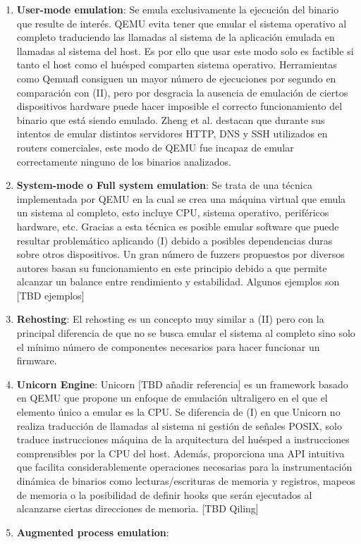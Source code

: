 \begin{enumerate}[I]
    \item \textbf{User-mode emulation}: Se emula exclusivamente la ejecución del binario que resulte de interés. QEMU evita tener que emular el sistema 
    operativo al completo traduciendo las llamadas al sistema de la aplicación emulada en llamadas al sistema del host. Es por ello que usar este modo 
    solo es factible si tanto el host como el huésped comparten sistema operativo. Herramientas como Qemuafl\cite{qemuafl} consiguen un mayor número de 
    ejecuciones por segundo en comparación con (II), pero por desgracia la ausencia de emulación de ciertos dispositivos hardware puede hacer imposible 
    el correcto funcionamiento del binario que está siendo emulado. Zheng et al.\cite{Zheng2019} destacan que durante sus intentos de emular distintos 
    servidores HTTP, DNS y SSH utilizados en routers comerciales, este modo de QEMU fue incapaz de emular correctamente ninguno de los binarios analizados.
    \item \textbf{System-mode o Full system emulation}: Se trata de una técnica implementada por QEMU en la cual se crea una máquina virtual que emula un 
    sistema al completo, esto incluye CPU, sistema operativo, periféricos hardware, etc. Gracias a esta técnica es posible emular software que puede resultar 
    problemático aplicando (I) debido a posibles dependencias duras sobre otros dispositivos. Un gran número de fuzzers propuestos por diversos autores 
    basan su funcionamiento en este principio debido a que permite alcanzar un balance entre rendimiento y estabilidad. Algunos ejemplos son [TBD ejemplos]
    \item \textbf{Rehosting}: El rehosting\cite{Fasano2021} es un concepto muy similar a (II) pero con la principal diferencia de que no se busca emular el 
    sistema al completo sino solo el mínimo número de componentes necesarios para hacer funcionar un firmware.
    \item \textbf{Unicorn Engine}: Unicorn [TBD añadir referencia] es un framework basado en QEMU que propone un enfoque de emulación ultraligero en el que el elemento único a 
    emular es la CPU. Se diferencia de (I) en que Unicorn no realiza traducción de llamadas al sistema ni gestión de señales POSIX, solo traduce instrucciones 
    máquina de la arquitectura del huésped a instrucciones comprensibles por la CPU del host. Además, proporciona una API intuitiva que facilita 
    considerablemente operaciones necesarias para la instrumentación dinámica de binarios como lecturas/escrituras de memoria y registros, mapeos de memoria o 
    la posibilidad de definir hooks que serán ejecutados al alcanzarse ciertas direcciones de memoria. [TBD Qiling]
    \item \textbf{Augmented process emulation}:
\end{enumerate} 

